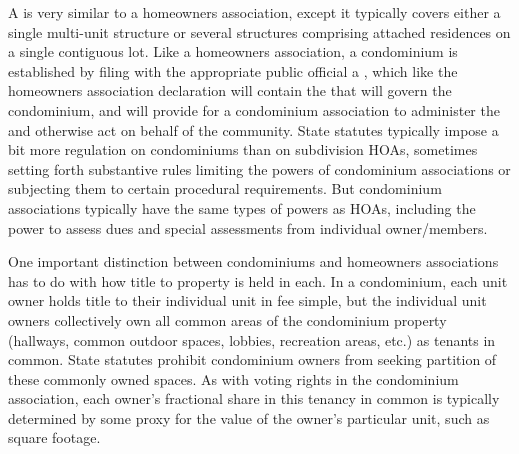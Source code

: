 A  is very similar to a homeowners association, except it
typically covers either a single multi-unit structure or several structures
comprising attached residences on a single contiguous lot. Like a homeowners
association, a condominium is established by filing with the appropriate public
official a , which like the homeowners
association declaration will contain the  that will govern the
condominium, and will provide for a condominium association to administer the
 and otherwise act on behalf of the community. State statutes
typically impose a bit more regulation on condominiums than on subdivision HOAs,
sometimes setting forth substantive rules limiting the powers of condominium
associations or subjecting them to certain procedural requirements. But
condominium associations typically have the same types of powers as HOAs,
including the power to assess dues and special assessments from individual
owner/members. 

One important distinction between condominiums and homeowners associations has
to do with how title to property is held in each. In a condominium, each unit
owner holds title to their individual unit in fee simple, but the individual
unit owners collectively own all common areas of the condominium property
(hallways, common outdoor spaces, lobbies, recreation areas, etc.) as tenants in
common. State statutes prohibit condominium owners from seeking partition of
these commonly owned spaces. As with voting rights in the condominium
association, each owner's fractional share in this tenancy in common is
typically determined by some proxy for the value of the owner's particular unit,
such as square footage.

